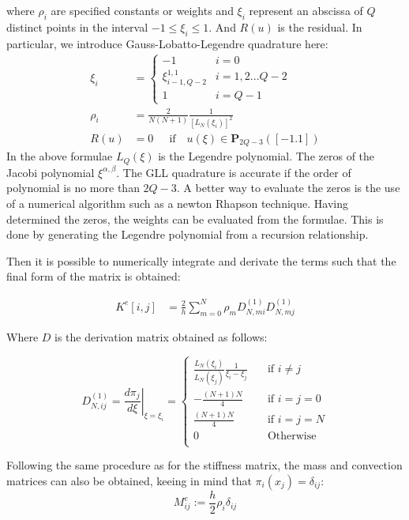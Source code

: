 \documentclass[
]{scrartcl}
\begin{document}
where \(\rho_i\) are specified constants or weights and \(\xi_i\)
represent an abscissa of \(Q\) distinct points in the interval
\(−1 \leq \xi_i \leq 1\). And \(R(u)\) is the residual. In particular,
we introduce Gauss-Lobatto-Legendre quadrature here: \begin{align}
    \xi_i &= 
    \begin{cases} 
      -1 & i= 0 \\
      \xi_{i-1,Q-2}^{1,1} & i=1,2... Q-2 \\
      1 & i = Q-1 
   \end{cases}\\
   \rho_i&=\frac{2}{N(N+1)}\frac{1}{[L_N(\xi_i)]^2}\\
   R(u) &= 0 ~~~~~\text{ if }~~~ u(\xi)\in\mathbf{P}_{2Q-3}([-1.1])
\end{align} In the above formulae \(L_Q(\xi)\) is the Legendre
polynomial. The zeros of the Jacobi polynomial \(\xi^{\alpha,\beta}\).
The GLL quadrature is accurate if the order of polynomial is no more
than \(2Q-3\). A better way to evaluate the zeros is the use of a
numerical algorithm such as a newton Rhapson technique. Having
determined the zeros, the weights can be evaluated from the formulae.
This is done by generating the Legendre polynomial from a recursion
relationship.

Then it is possible to numerically integrate and derivate the terms such
that the final form of the matrix is obtained:

\begin{align}
K^{e}[i,j]&=\frac{2}{h}\sum_{m=0}^{N} \rho_m D^{(1)}_{N,mi}D^{(1)}_{N,mj} 
\end{align}

Where \(D\) is the derivation matrix obtained as follows:

\begin{equation}
D_{N,ij}^{(1)} = \left. \frac{d\pi_j}{d\xi}\right\rvert_{\xi=\xi_i} =
     \begin{cases}
       \frac{L_N(\xi_i)}{L_N(\xi_j)}\frac{1}{\xi_i-\xi_j} &\quad\text{if }i \neq j \\
       -\frac{(N+1)N}{4} &\quad\text{if }i=j=0 \\
       \frac{(N+1)N}{4} &\quad\text{if }i=j=N \\
       0 &\quad\text{Otherwise } \\
     \end{cases}
\end{equation}

Following the same procedure as for the stiffness matrix, the mass and
convection matrices can also be obtained, keeing in mind that
\(\pi_i(x_j)=\delta_{ij}\): \begin{equation}
     M^{e}_{ij} := \frac{h}{2} \rho_i\delta_{ij} 
\end{equation}
\end{document}
